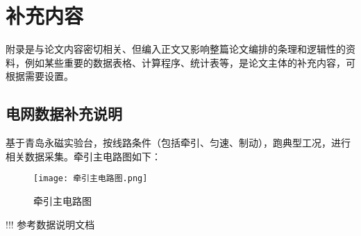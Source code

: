 \chapter{补充内容}

附录是与论文内容密切相关、但编入正文又影响整篇论文编排的条理和逻辑性的资料，例如某些重要的数据表格、计算程序、统计表等，是论文主体的补充内容，可根据需要设置。

\section{电网数据补充说明}
基于青岛永磁实验台，按线路条件（包括牵引、匀速、制动），跑典型工况，进行相关数据采集。牵引主电路图如下：
\begin{figure}
  \centering
  \texttt{[image: 牵引主电路图.png]}
  \caption{牵引主电路图}
  \label{fig:qianyin}
\end{figure}
!!! 参考数据说明文档
